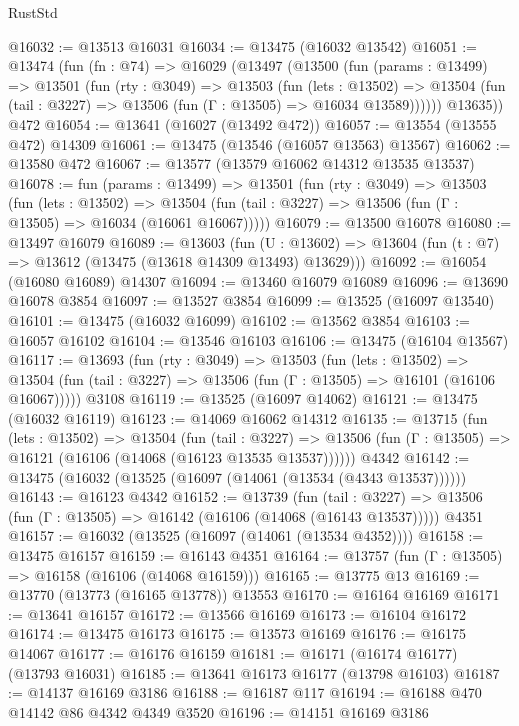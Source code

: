 \begin{lexlean}{RustStd}
\begin{coremodule}
{\begin{coremodule}
{{{{{{{{{{{{{{{{{{{{{{{{{{{{{{{{{{{{{@16032 := @13513 @16031
@16034 := @13475 (@16032 @13542)
@16051 := @13474
    (fun (fn : @74) =>
    @16029
      (@13497
        (@13500
          (fun (params : @13499) =>
          @13501
            (fun (rty : @3049) =>
            @13503
              (fun (lets : @13502) =>
              @13504 (fun (tail : @3227) => @13506 (fun (Γ : @13505) => @16034 @13589))))))
        @13635))
    @472
@16054 := @13641 (@16027 (@13492 @472))
@16057 := @13554 (@13555 @472) @14309
@16061 := @13475 (@13546 (@16057 @13563) @13567)
@16062 := @13580 @472
@16067 := @13577 (@13579 @16062 @14312 @13535 @13537)
@16078 := fun (params : @13499) =>
  @13501
    (fun (rty : @3049) =>
    @13503
      (fun (lets : @13502) =>
      @13504 (fun (tail : @3227) => @13506 (fun (Γ : @13505) => @16034 (@16061 @16067)))))
@16079 := @13500 @16078
@16080 := @13497 @16079
@16089 := @13603
    (fun (U : @13602) => @13604 (fun (t : @7) => @13612 (@13475 (@13618 @14309 @13493) @13629)))
@16092 := @16054 (@16080 @16089) @14307
@16094 := @13460 @16079 @16089
@16096 := @13690 @16078 @3854
@16097 := @13527 @3854
@16099 := @13525 (@16097 @13540)
@16101 := @13475 (@16032 @16099)
@16102 := @13562 @3854
@16103 := @16057 @16102
@16104 := @13546 @16103
@16106 := @13475 (@16104 @13567)
@16117 := @13693
    (fun (rty : @3049) =>
    @13503
      (fun (lets : @13502) =>
      @13504 (fun (tail : @3227) => @13506 (fun (Γ : @13505) => @16101 (@16106 @16067)))))
    @3108
@16119 := @13525 (@16097 @14062)
@16121 := @13475 (@16032 @16119)
@16123 := @14069 @16062 @14312
@16135 := @13715
    (fun (lets : @13502) =>
    @13504
      (fun (tail : @3227) =>
      @13506 (fun (Γ : @13505) => @16121 (@16106 (@14068 (@16123 @13535 @13537))))))
    @4342
@16142 := @13475 (@16032 (@13525 (@16097 (@14061 (@13534 (@4343 @13537))))))
@16143 := @16123 @4342
@16152 := @13739
    (fun (tail : @3227) => @13506 (fun (Γ : @13505) => @16142 (@16106 (@14068 (@16143 @13537)))))
    @4351
@16157 := @16032 (@13525 (@16097 (@14061 (@13534 @4352))))
@16158 := @13475 @16157
@16159 := @16143 @4351
@16164 := @13757 (fun (Γ : @13505) => @16158 (@16106 (@14068 @16159)))
@16165 := @13775 @13
@16169 := @13770 (@13773 (@16165 @13778)) @13553
@16170 := @16164 @16169
@16171 := @13641 @16157
@16172 := @13566 @16169
@16173 := @16104 @16172
@16174 := @13475 @16173
@16175 := @13573 @16169
@16176 := @16175 @14067
@16177 := @16176 @16159
@16181 := @16171 (@16174 @16177) (@13793 @16031)
@16185 := @13641 @16173 @16177 (@13798 @16103)
@16187 := @14137 @16169 @3186
@16188 := @16187 @117
@16194 := @16188 @470 @14142 @86 @4342 @4349 @3520
@16196 := @14151 @16169 @3186
}}}}}}}}}}}}}}}}}}}}}}}}}}}}}}}}}}}}}
\end{coremodule}}
\end{coremodule}
\end{lexlean}
